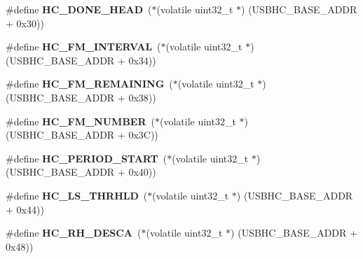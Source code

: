 \begin{DoxyCompactItemize}
\item 
\mbox{\label{group__lpc24xx__regs_gad6a0e8bb77c4fd391973c8e8a539aa64}} 
\#define {\bfseries H\+C\+\_\+\+D\+O\+N\+E\+\_\+\+H\+E\+AD}~($\ast$(volatile uint32\+\_\+t $\ast$) (U\+S\+B\+H\+C\+\_\+\+B\+A\+S\+E\+\_\+\+A\+D\+DR + 0x30))
\item 
\mbox{\label{group__lpc24xx__regs_ga3d0451f115b53bf24fea39dd00a96a26}} 
\#define {\bfseries H\+C\+\_\+\+F\+M\+\_\+\+I\+N\+T\+E\+R\+V\+AL}~($\ast$(volatile uint32\+\_\+t $\ast$) (U\+S\+B\+H\+C\+\_\+\+B\+A\+S\+E\+\_\+\+A\+D\+DR + 0x34))
\item 
\mbox{\label{group__lpc24xx__regs_ga92231e127584724b39a14ea50a259916}} 
\#define {\bfseries H\+C\+\_\+\+F\+M\+\_\+\+R\+E\+M\+A\+I\+N\+I\+NG}~($\ast$(volatile uint32\+\_\+t $\ast$) (U\+S\+B\+H\+C\+\_\+\+B\+A\+S\+E\+\_\+\+A\+D\+DR + 0x38))
\item 
\mbox{\label{group__lpc24xx__regs_ga26789045ef7c87e11dd52e1574326690}} 
\#define {\bfseries H\+C\+\_\+\+F\+M\+\_\+\+N\+U\+M\+B\+ER}~($\ast$(volatile uint32\+\_\+t $\ast$) (U\+S\+B\+H\+C\+\_\+\+B\+A\+S\+E\+\_\+\+A\+D\+DR + 0x3\+C))
\item 
\mbox{\label{group__lpc24xx__regs_ga5e8ec24805635d17e2cb9aaffa316b0e}} 
\#define {\bfseries H\+C\+\_\+\+P\+E\+R\+I\+O\+D\+\_\+\+S\+T\+A\+RT}~($\ast$(volatile uint32\+\_\+t $\ast$) (U\+S\+B\+H\+C\+\_\+\+B\+A\+S\+E\+\_\+\+A\+D\+DR + 0x40))
\item 
\mbox{\label{group__lpc24xx__regs_gaa3ddba5bab8ba134ef95313e86d59c9a}} 
\#define {\bfseries H\+C\+\_\+\+L\+S\+\_\+\+T\+H\+R\+H\+LD}~($\ast$(volatile uint32\+\_\+t $\ast$) (U\+S\+B\+H\+C\+\_\+\+B\+A\+S\+E\+\_\+\+A\+D\+DR + 0x44))
\item 
\mbox{\label{group__lpc24xx__regs_ga418b8bc5917bf4c475a9e66597ab04e0}} 
\#define {\bfseries H\+C\+\_\+\+R\+H\+\_\+\+D\+E\+S\+CA}~($\ast$(volatile uint32\+\_\+t $\ast$) (U\+S\+B\+H\+C\+\_\+\+B\+A\+S\+E\+\_\+\+A\+D\+DR + 0x48))
\item 
\mbox{\label{group__lpc24xx__regs_gaa477ef67b4b2488aa9191e0b7f50179b}} 

\end{DoxyCompactItemize}
